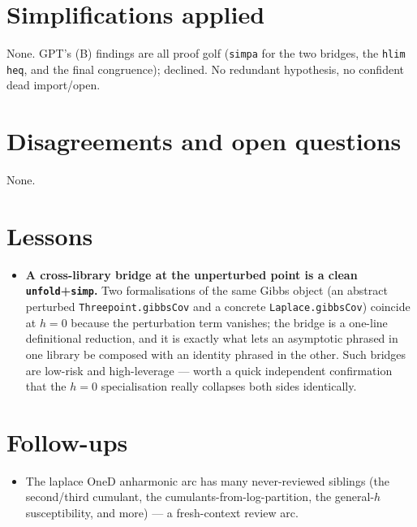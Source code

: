 \documentclass[11pt]{article}
\begin{document}
\section{Simplifications applied}
None. GPT's (B) findings are all proof golf (\texttt{simpa} for the two bridges, the \texttt{hlim} \texttt{heq},
and the final congruence); declined. No redundant hypothesis, no confident dead import/open.

\section{Disagreements and open questions}
None.

\section{Lessons}
\begin{itemize}[noitemsep]
  \item \textbf{A cross-library bridge at the unperturbed point is a clean \texttt{unfold}+\texttt{simp}.}
    Two formalisations of the same Gibbs object (an abstract perturbed \texttt{Threepoint.gibbsCov} and a
    concrete \texttt{Laplace.gibbsCov}) coincide at $h=0$ because the perturbation term vanishes; the bridge is
    a one-line definitional reduction, and it is exactly what lets an asymptotic phrased in one library be
    composed with an identity phrased in the other. Such bridges are low-risk and high-leverage --- worth a
    quick independent confirmation that the $h=0$ specialisation really collapses both sides identically.
\end{itemize}

\section{Follow-ups}
\begin{itemize}[noitemsep]
  \item The laplace OneD anharmonic arc has many never-reviewed siblings (the second/third cumulant, the
    cumulants-from-log-partition, the general-$h$ susceptibility, and more) --- a fresh-context review arc.
\end{itemize}
\end{document}
